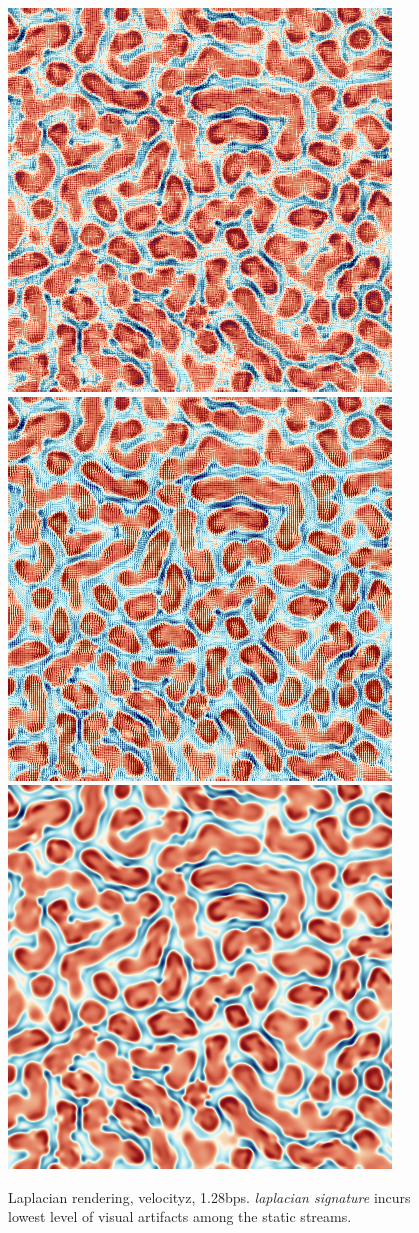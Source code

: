 \begin{figure}[h]
	{\includegraphics[width=0.32\linewidth]{img/laplacian/laplacian_3.png}}
	{\includegraphics[width=0.32\linewidth]{img/laplacian/laplacian_4.png}}
	{\includegraphics[width=0.32\linewidth]{img/laplacian/groundtruth_laplacian_0.png}}
	\caption{Laplacian rendering, velocityz, 1.28bps. \emph{laplacian signature} incurs lowest level of visual artifacts among the static streams.}
	\label{fig:laplacian-precision-comparison}
\end{figure}



